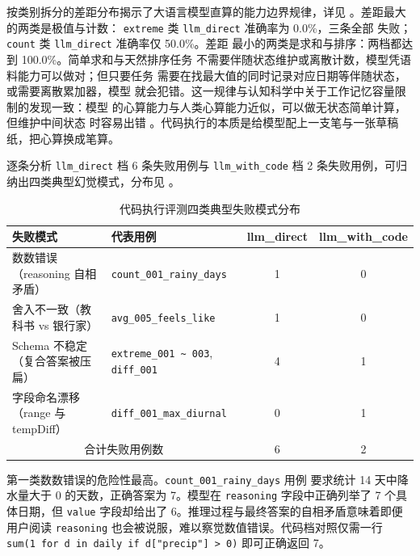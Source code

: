 按类别拆分的差距分布揭示了大语言模型直算的能力边界规律，详见
。差距最大的两类是极值与计数：
\texttt{extreme} 类 \texttt{llm\_\bk{}direct} 准确率为 0.0\%，三条全部
失败；\texttt{count} 类 \texttt{llm\_\bk{}direct} 准确率仅 50.0\%。差距
最小的两类是求和与排序：两档都达到 100.0\%。简单求和与天然排序任务
不需要伴随状态维护或离散计数，模型凭语料能力可以做对；但只要任务
需要在找最大值的同时记录对应日期等伴随状态，或需要离散累加器，模型
就会犯错。这一规律与认知科学中关于工作记忆容量限制的发现一致：模型
的心算能力与人类心算能力近似，可以做无状态简单计算，但维护中间状态
时容易出错 \cite{ref20}。代码执行的本质是给模型配上一支笔与一张草稿
纸，把心算换成笔算。

逐条分析 \texttt{llm\_\bk{}direct} 档 6 条失败用例与 \texttt{llm\_\bk{}with\_\bk{}code}
档 2 条失败用例，可归纳出四类典型幻觉模式，分布见
。

\begin{table}[!htbp]
    \centering
    \caption{代码执行评测四类典型失败模式分布}
    \label{tab:code-fail-modes}
    \song\fontsize{9pt}{12pt}\selectfont
    \renewcommand{\arraystretch}{0.95}
    \begin{tabular}{llcc}
        \toprule
        失败模式 & 代表用例 & llm\_direct & llm\_with\_code \\
        \midrule
        数数错误（reasoning 自相矛盾） & \texttt{count\_\bk{}001\_\bk{}rainy\_\bk{}days} & 1 & 0 \\
        舍入不一致（教科书 vs 银行家） & \texttt{avg\_\bk{}005\_\bk{}feels\_\bk{}like} & 1 & 0 \\
        Schema 不稳定（复合答案被压扁） & \texttt{extreme\_001 \textasciitilde{} 003}, \texttt{diff\_\bk{}001} & 4 & 1 \\
        字段命名漂移（range 与 tempDiff） & \texttt{diff\_\bk{}001\_\bk{}max\_\bk{}diurnal} & 0 & 1 \\
        \midrule
        \multicolumn{2}{c}{合计失败用例数} & 6 & 2 \\
        \bottomrule
    \end{tabular}
\end{table}

第一类数数错误的危险性最高。\texttt{count\_\bk{}001\_\bk{}rainy\_\bk{}days} 用例
要求统计 14 天中降水量大于 0 的天数，正确答案为 7。模型在
\texttt{reasoning} 字段中正确列举了 7 个具体日期，但 \texttt{value}
字段却给出了 6。推理过程与最终答案的自相矛盾意味着即便用户阅读
\texttt{reasoning} 也会被说服，难以察觉数值错误。代码档对照仅需一行
\texttt{sum(1 for d in daily if d["precip"] > 0)} 即可正确返回 7。

